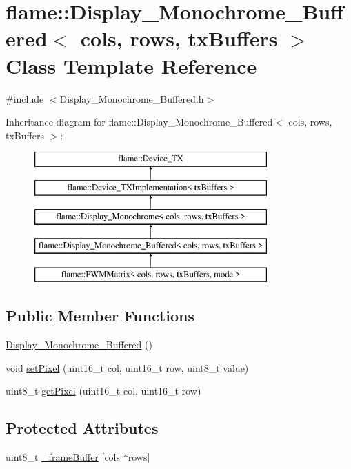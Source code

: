 \hypertarget{classflame_1_1_display___monochrome___buffered}{\section{flame\-:\-:Display\-\_\-\-Monochrome\-\_\-\-Buffered$<$ cols, rows, tx\-Buffers $>$ Class Template Reference}
\label{classflame_1_1_display___monochrome___buffered}
}


{\ttfamily \#include $<$Display\-\_\-\-Monochrome\-\_\-\-Buffered.\-h$>$}

Inheritance diagram for flame\-:\-:Display\-\_\-\-Monochrome\-\_\-\-Buffered$<$ cols, rows, tx\-Buffers $>$\-:\begin{figure}[H]
\begin{center}
\leavevmode
\includegraphics[height=5.000000cm]{classflame_1_1_display___monochrome___buffered}
\end{center}
\end{figure}
\subsection*{Public Member Functions}
\begin{DoxyCompactItemize}
\item 
\hyperlink{classflame_1_1_display___monochrome___buffered_afdfaefdd9c432d9f93d52232d6eb4985}{Display\-\_\-\-Monochrome\-\_\-\-Buffered} ()
\item 
void \hyperlink{classflame_1_1_display___monochrome___buffered_a5ffe666a9a5ae12931177c05307b48e1}{set\-Pixel} (uint16\-\_\-t col, uint16\-\_\-t row, uint8\-\_\-t value)
\item 
uint8\-\_\-t \hyperlink{classflame_1_1_display___monochrome___buffered_a003e20bbdf7f905cee2dcfb22be61268}{get\-Pixel} (uint16\-\_\-t col, uint16\-\_\-t row)
\end{DoxyCompactItemize}
\subsection*{Protected Attributes}
\begin{DoxyCompactItemize}
\item 
uint8\-\_\-t \hyperlink{classflame_1_1_display___monochrome___buffered_ad1811b000b6d38a4400da0784768544c}{\-\_\-frame\-Buffer} \mbox{[}cols $\ast$rows\mbox{]}
\end{DoxyCompactItemize}
